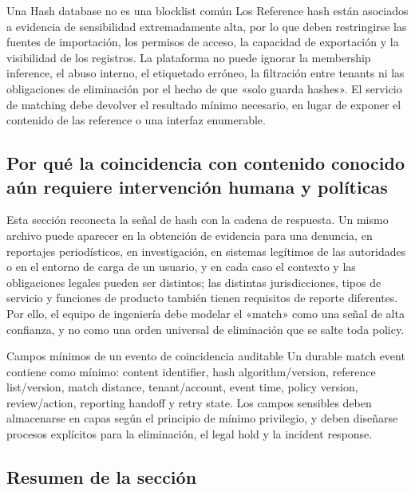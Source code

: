 \documentclass[a4paper]{article}
\begin{document}
\begin{warningbox}{Una Hash database no es una blocklist común}
Los Reference hash están asociados a evidencia de sensibilidad extremadamente alta, por lo que deben restringirse las fuentes de importación, los permisos de acceso, la capacidad de exportación y la visibilidad de los registros. La plataforma no puede ignorar la membership inference, el abuso interno, el etiquetado erróneo, la filtración entre tenants ni las obligaciones de eliminación por el hecho de que «solo guarda hashes». El servicio de matching debe devolver el resultado mínimo necesario, en lugar de exponer el contenido de las reference o una interfaz enumerable.
\end{warningbox}

\subsection{Por qué la coincidencia con contenido conocido aún requiere intervención humana y políticas}

Esta sección reconecta la señal de hash con la cadena de respuesta. Un mismo archivo puede aparecer en la obtención de evidencia para una denuncia, en reportajes periodísticos, en investigación, en sistemas legítimos de las autoridades o en el entorno de carga de un usuario, y en cada caso el contexto y las obligaciones legales pueden ser distintos; las distintas jurisdicciones, tipos de servicio y funciones de producto también tienen requisitos de reporte diferentes. Por ello, el equipo de ingeniería debe modelar el «match» como una señal de alta confianza, y no como una orden universal de eliminación que se salte toda policy.

\begin{importantbox}{Campos mínimos de un evento de coincidencia auditable}
Un durable match event contiene como mínimo: content identifier, hash algorithm/version, reference list/version, match distance, tenant/account, event time, policy version, review/action, reporting handoff y retry state. Los campos sensibles deben almacenarse en capas según el principio de mínimo privilegio, y deben diseñarse procesos explícitos para la eliminación, el legal hold y la incident response.
\end{importantbox}

\subsection{Resumen de la sección}
\end{document}
